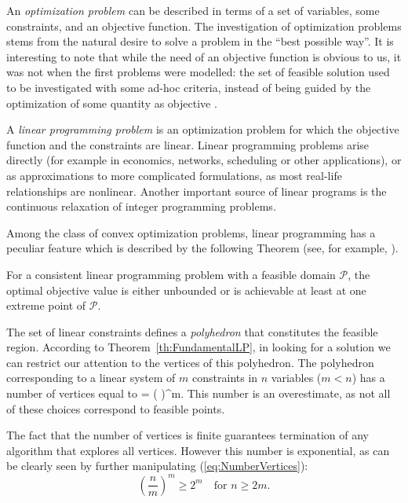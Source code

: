 An {\em optimization problem} can be described in terms of a set of variables, 
some constraints, and an objective function. 
The investigation of optimization problems stems from the natural
desire to solve a problem in the ``best possible way''.
It is interesting to note that while the need of an objective function 
is obvious to us, it was not when the first problems were modelled: the 
set of feasible solution used to be investigated with some ad-hoc criteria, 
instead of being guided by the optimization of some quantity as 
objective \cite{Dantzig02}.

A {\em linear programming problem} is an optimization problem for which
the objective function and the constraints are linear. 
Linear programming problems arise directly (for example in economics,
networks, scheduling or other applications), or as approximations to
more complicated formulations, as most real-life relationships are
nonlinear. Another important source of linear programs is the 
continuous relaxation of integer programming problems.

Among the class of convex optimization problems, linear programming
has a peculiar feature which is described by the following Theorem
(see, for example, \cite{FangPuthenpura93}).

\begin{theorem}
\label{th:FundamentalLP}
For a consistent linear programming problem with a
feasible domain $\mathcal{P}$, the optimal objective value is either
unbounded or is achievable at least at one extreme point of $\mathcal{P}$.
\end{theorem}

The set of linear constraints defines a {\em polyhedron} that constitutes
the feasible region.
According to Theorem~\ref{th:FundamentalLP}, in looking for a solution 
we can restrict our attention to the vertices of this polyhedron.
The polyhedron corresponding to a linear system of $m$ constraints 
in $n$ variables ($m < n$) has a number of vertices equal to
\be \label{eq:NumberVertices}
 =  \ge \left(  \right)^m.
\ee
This number is an overestimate, as not all of these choices correspond
to feasible points.

The fact that the number of vertices is finite guarantees termination 
of any algorithm that explores all vertices.
However this number is exponential, as can be clearly seen by further
manipulating (\ref{eq:NumberVertices}):
\[
\left( \frac{n}{m} \right)^m \ge 2^m 
\quad \mbox{for } n \ge 2m.
\]

